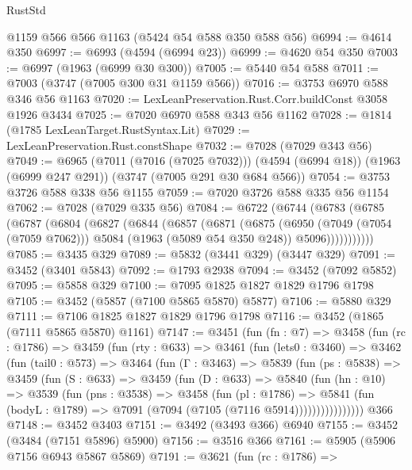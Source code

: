 \begin{lexlean}{RustStd}
\begin{coremodule}
    @1159
    @566
    @566
    @1163
    (@5424 @54 @588 @350 @588 @56)
@6994 := @4614 @350
@6997 := @6993 (@4594 (@6994 @23))
@6999 := @4620 @54 @350
@7003 := @6997 (@1963 (@6999 @30 @300))
@7005 := @5440 @54 @588
@7011 := @7003 (@3747 (@7005 @300 @31 @1159 @566))
@7016 := @3753 @6970 @588 @346 @56 @1163
@7020 := LexLeanPreservation.Rust.Corr.buildConst @3058 @1926 @3434
@7025 := @7020 @6970 @588 @343 @56 @1162
@7028 := @1814 (@1785 LexLeanTarget.RustSyntax.Lit)
@7029 := LexLeanPreservation.Rust.constShape
@7032 := @7028 (@7029 @343 @56)
@7049 := @6965
    (@7011 (@7016 (@7025 @7032)))
    (@4594 (@6994 @18))
    (@1963 (@6999 @247 @291))
    (@3747 (@7005 @291 @30 @684 @566))
@7054 := @3753 @3726 @588 @338 @56 @1155
@7059 := @7020 @3726 @588 @335 @56 @1154
@7062 := @7028 (@7029 @335 @56)
@7084 := @6722
    (@6744
      (@6783
        (@6785
          (@6787
            (@6804
              (@6827
                (@6844
                  (@6857
                    (@6871
                      (@6875
                        (@6950
                          (@7049 (@7054 (@7059 @7062)))
                          @5084
                          (@1963 (@5089 @54 @350 @248))
                          @5096)))))))))))
@7085 := @3435 @329
@7089 := @5832 (@3441 @329) (@3447 @329)
@7091 := @3452 (@3401 @5843)
@7092 := @1793 @2938
@7094 := @3452 (@7092 @5852)
@7095 := @5858 @329
@7100 := @7095 @1825 @1827 @1829 @1796 @1798
@7105 := @3452 (@5857 (@7100 @5865 @5870) @5877)
@7106 := @5880 @329
@7111 := @7106 @1825 @1827 @1829 @1796 @1798
@7116 := @3452 (@1865 (@7111 @5865 @5870) @1161)
@7147 := @3451
    (fun (fn : @7) =>
    @3458
      (fun (rc : @1786) =>
      @3459
        (fun (rty : @633) =>
        @3461
          (fun (lets0 : @3460) =>
          @3462
            (fun (tail0 : @573) =>
            @3464
              (fun (Γ : @3463) =>
              @5839
                (fun (ps : @5838) =>
                @3459
                  (fun (S : @633) =>
                  @3459
                    (fun (D : @633) =>
                    @5840
                      (fun (hn : @10) =>
                      @3539
                        (fun (pns : @3538) =>
                        @3458
                          (fun (pl : @1786) =>
                          @5841
                            (fun (bodyL : @1789) => @7091 (@7094 (@7105 (@7116 @5914))))))))))))))))
    @366
@7148 := @3452 @3403
@7151 := @3492 (@3493 @366) @6940
@7155 := @3452 (@3484 (@7151 @5896) @5900)
@7156 := @3516 @366
@7161 := @5905 (@5906 @7156 @6943 @5867 @5869)
@7191 := @3621
    (fun (rc : @1786) =>

\end{coremodule}
\end{lexlean}
